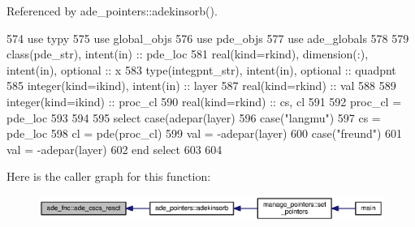 Referenced by ade\+\_\+pointers\+::adekinsorb().


\begin{DoxyCode}
574       \textcolor{keywordtype}{use }typy
575       \textcolor{keywordtype}{use }global_objs
576       \textcolor{keywordtype}{use }pde_objs
577       \textcolor{keywordtype}{use }ade_globals
578       
579       \textcolor{keywordtype}{class}(pde_str), \textcolor{keywordtype}{intent(in)} :: pde\_loc
581       \textcolor{keywordtype}{real(kind=rkind)}, \textcolor{keywordtype}{dimension(:)}, \textcolor{keywordtype}{intent(in)}, \textcolor{keywordtype}{optional}    :: x
583       \textcolor{keywordtype}{type}(integpnt_str), \textcolor{keywordtype}{intent(in)}, \textcolor{keywordtype}{optional} :: quadpnt
585       \textcolor{keywordtype}{integer(kind=ikind)}, \textcolor{keywordtype}{intent(in)} :: layer
587       \textcolor{keywordtype}{real(kind=rkind)}                :: val 
588       
589       \textcolor{keywordtype}{integer(kind=ikind)} :: proc\_cl
590       \textcolor{keywordtype}{real(kind=rkind)} :: cs, cl
591       
592       proc\_cl = pde\_loc%
593       
594       
595       \textcolor{keywordflow}{select case}(adepar(layer)%
596         \textcolor{keywordflow}{case}(\textcolor{stringliteral}{"langmu"})
597           cs = pde\_loc%
598           cl = pde(proc\_cl)%
599           val = -adepar(layer)%
600         \textcolor{keywordflow}{case}(\textcolor{stringliteral}{"freund"})
601           val = -adepar(layer)%
602 \textcolor{keywordflow}{      end select}
603       
604       
\end{DoxyCode}


Here is the caller graph for this function\+:\nopagebreak
\begin{figure}[H]
\begin{center}
\leavevmode
\includegraphics[width=350pt]{namespaceade__fnc_afb034eeab56e8c889cd9adae76cf038c_icgraph}
\end{center}
\end{figure}


